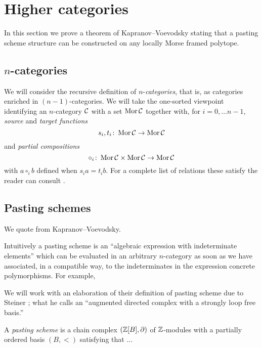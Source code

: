 
\section{Higher categories}

In this section we prove a theorem of Kapranov--Voevodsky \cite[Theorem 2.3]{kapranov1991polycategory} stating that a pasting scheme structure can be constructed on any locally Morse framed polytope.

\subsection{$n$-categories}

We will consider the recursive definition of $n$-\textit{categories}, that is, as categories enriched in $(n-1)$-categories.
We will take the one-sorted viewpoint identifying an $n$-category $\mathcal{C}$ with a set $\operatorname{Mor}\mathcal{C}$ together with, for $i = 0,\dots n-1$, \textit{source} and \textit{target functions}
\[
s_i, t_i \colon \operatorname{Mor}\mathcal{C} \to \operatorname{Mor}\mathcal{C}
\]
and \textit{partial compositions}
\[
\circ_i \colon \operatorname{Mor}\mathcal{C} \times \operatorname{Mor}\mathcal{C} \to \operatorname{Mor}\mathcal{C}
\]
with $a \circ_i b$ defined when $s_i a = t_i b$.
For a complete list of relations these satisfy the reader can consult \cite[Definition 2.1]{steiner2004omega}.

\subsection{Pasting schemes}

We quote from Kapranov--Voevodsky. \cite[p.~12]{kapranov1991polycategory}
\begin{displayquote}
	Intuitively a pasting scheme is an ``algebraic expression with indeterminate elements'' which can be evaluated in an arbitrary $n$-category as soon as we have associated, in a compatible way, to the indeterminates in the expression concrete polymorphisms.
	For example,
	\begin{center}
		
	\end{center}
\end{displayquote}
We will work with an elaboration of their definition of pasting scheme due to Steiner \cite{steiner2004omega}; what he calls an ``augmented directed complex with a strongly loop free basis.''

A \textit{pasting scheme} is a chain complex $(\mathbb{Z}[B], \operatorname{\partial})$ of $\mathbb{Z}$-modules with a partially ordered basis $(B,<)$ satisfying that ...

